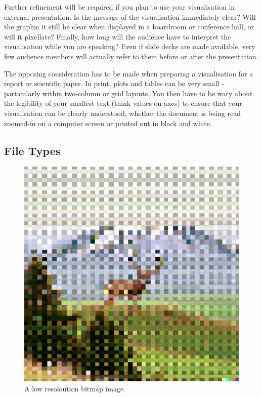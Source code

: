 \documentclass[
  letterpaper,
  DIV=11,
  numbers=noendperiod]{scrreprt}
\begin{document}
Further refinement will be required if you plan to use your
visualisation in external presentation. Is the message of the
visualisation immediately clear? Will the graphic it still be clear when
displayed in a boardroom or conference hall, or will it pixellate?
Finally, how long will the audience have to interpret the visualisation
while you are speaking? Even if slide decks are made available, very few
audience members will actually refer to them before or after the
presentation.

The opposing consideration has to be made when preparing a visualisation
for a report or scientific paper. In print, plots and tables can be very
small - particularly within two-column or grid layouts. You then have to
be wary about the legibility of your smallest text (think values on
axes) to ensure that your visualisation can be clearly understood,
whether the document is being read zoomed-in on a computer screen or
printed out in black and white.

\subsection{File Types}\label{file-types}

\begin{figure}[H]

{\centering \includegraphics{images/303-data-visualisation/dalle-pixellated-image.png}

}

\caption{A low resoloution bitmap image.}

\end{figure}%
\end{document}
